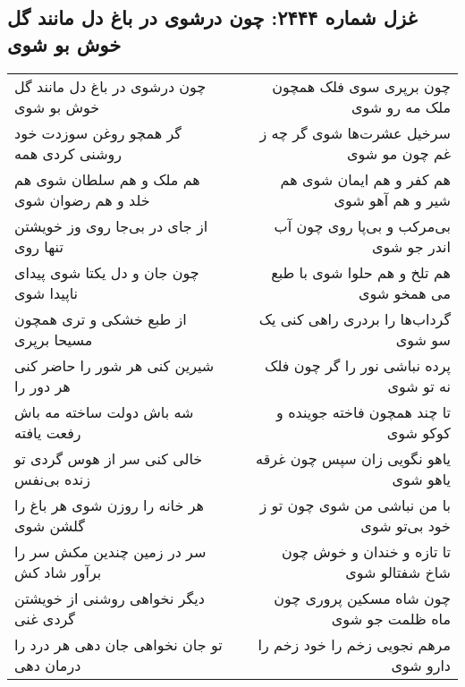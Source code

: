 \begin{center}
\section*{غزل شماره ۲۴۴۴: چون درشوی در باغ دل مانند گل خوش بو شوی}
\label{sec:2444}
\begin{longtable}{l p{0.5cm} r}
چون درشوی در باغ دل مانند گل خوش بو شوی
&&
چون برپری سوی فلک همچون ملک مه رو شوی
\\
گر همچو روغن سوزدت خود روشنی کردی همه
&&
سرخیل عشرت‌ها شوی گر چه ز غم چون مو شوی
\\
هم ملک و هم سلطان شوی هم خلد و هم رضوان شوی
&&
هم کفر و هم ایمان شوی هم شیر و هم آهو شوی
\\
از جای در بی‌جا روی وز خویشتن تنها روی
&&
بی‌مرکب و بی‌پا روی چون آب اندر جو شوی
\\
چون جان و دل یکتا شوی پیدای ناپیدا شوی
&&
هم تلخ و هم حلوا شوی با طبع می همخو شوی
\\
از طبع خشکی و تری همچون مسیحا برپری
&&
گرداب‌ها را بردری راهی کنی یک سو شوی
\\
شیرین کنی هر شور را حاضر کنی هر دور را
&&
پرده نباشی نور را گر چون فلک نه تو شوی
\\
شه باش دولت ساخته مه باش رفعت یافته
&&
تا چند همچون فاخته جوینده و کوکو شوی
\\
خالی کنی سر از هوس گردی تو زنده بی‌نفس
&&
یاهو نگویی زان سپس چون غرقه یاهو شوی
\\
هر خانه را روزن شوی هر باغ را گلشن شوی
&&
با من نباشی من شوی چون تو ز خود بی‌تو شوی
\\
سر در زمین چندین مکش سر را برآور شاد کش
&&
تا تازه و خندان و خوش چون شاخ شفتالو شوی
\\
دیگر نخواهی روشنی از خویشتن گردی غنی
&&
چون شاه مسکین پروری چون ماه ظلمت جو شوی
\\
تو جان نخواهی جان دهی هر درد را درمان دهی
&&
مرهم نجویی زخم را خود زخم را دارو شوی
\\
\end{longtable}
\end{center}
